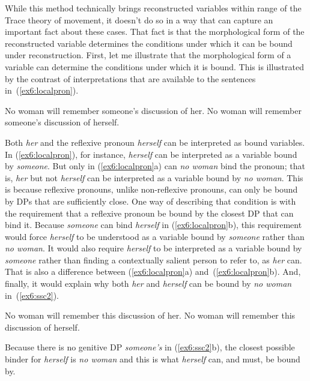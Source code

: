 While this method technically brings reconstructed variables within range of the Trace theory of movement, it doesn't do so in a way that can capture an important fact about these cases. That fact is that the morphological form of the reconstructed variable determines the conditions under which it can be bound under reconstruction. First, let me illustrate that the morphological form of a variable can determine the conditions under which it is bound. This is illustrated by the contrast of interpretations that are available to the sentences in~(\ref{ex6:localpron}).
\begin{exe}
\raggedright
	\ex \label{ex6:localpron}
	\begin{xlist}
		\ex No woman will remember someone's discussion of her.
		\ex No woman will remember someone's discussion of herself.
	\end{xlist}
\end{exe}
Both \emph{her} and the reflexive pronoun \emph{herself} can be interpreted as bound variables. In (\ref{ex6:localpron}), for instance, \emph{herself} can be interpreted as a variable bound by \emph{someone}. But only in (\ref{ex6:localpron}a) can \emph{no woman} bind the pronoun; that is, \emph{her} but not \emph{herself} can be interpreted as a variable bound by \emph{no woman}. This is because reflexive pronouns, unlike non-reflexive pronouns, can only be bound by DPs that are sufficiently close. One way of describing that condition is with the requirement that a reflexive pronoun be bound by the closest DP that can bind it. Because \emph{someone} can bind \emph{herself} in (\ref{ex6:localpron}b), this requirement would force \emph{herself} to be understood as a variable bound by \emph{someone} rather than \emph{no woman}. It would also require \emph{herself} to be interpreted as a variable bound by \emph{someone} rather than finding a contextually salient person to refer to, as \emph{her} can. That is also a difference between (\ref{ex6:localpron}a) and~(\ref{ex6:localpron}b). And, finally, it would explain why both \emph{her} and \emph{herself} can be bound by \emph{no woman} in~(\ref{ex6:ssc2}).
\begin{exe}
\raggedright
	\ex \label{ex6:ssc2}
	\begin{xlist}
		\ex No woman will remember this discussion of her.
		\ex No woman will remember this discussion of herself.
	\end{xlist}
\end{exe}
Because there is no genitive DP \emph{someone's} in (\ref{ex6:ssc2}b), the closest possible binder for \emph{herself} is \emph{no woman} and this is what \emph{herself} can, and must, be bound by.

